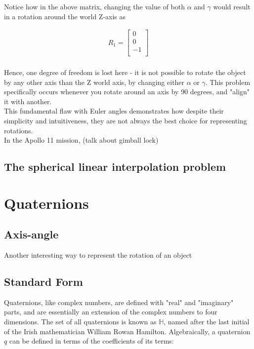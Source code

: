 \documentclass[12pt, a4paper]{article}
\begin{document}
Notice how in the above matrix, changing the value of both $\alpha$ and $\gamma$
would result in a rotation around the world Z-axis as

\begin{align*}
    R_1 = \begin{bmatrix} 0  \\
              0  \\
              -1 \\
          \end{bmatrix}
\end{align*} \\

Hence, one degree of freedom is lost here - it is not possible to rotate the
object by any other axis than the Z world axis, by changing either $\alpha$ or
$\gamma$. This problem specifically occurs whenever you rotate around an axis by
90 degrees, and "align" it with another. \\

This fundamental flaw with Euler angles demonstrates how despite their
simplicity and intuitiveness, they are not always the best choice for
representing rotations. \\

In the Apollo 11 mission, (talk about gimball lock)

\subsection{The spherical linear interpolation problem}

\section{Quaternions}
\subsection{Axis-angle}
Another interesting way to represent the rotation of an object

\subsection{Standard Form}
Quaternions, like complex numbers, are defined with "real" and "imaginary"
parts, and are essentially an extension of the complex numbers to four
dimensions. The set of all quaternions is known as $\mathbb{H}$, named after the
last initial of the Irish mathematician William Rowan Hamilton. Algebraically, a
quaternion $q$ can be defined in terms of the coefficients of its terms:
\end{document}
